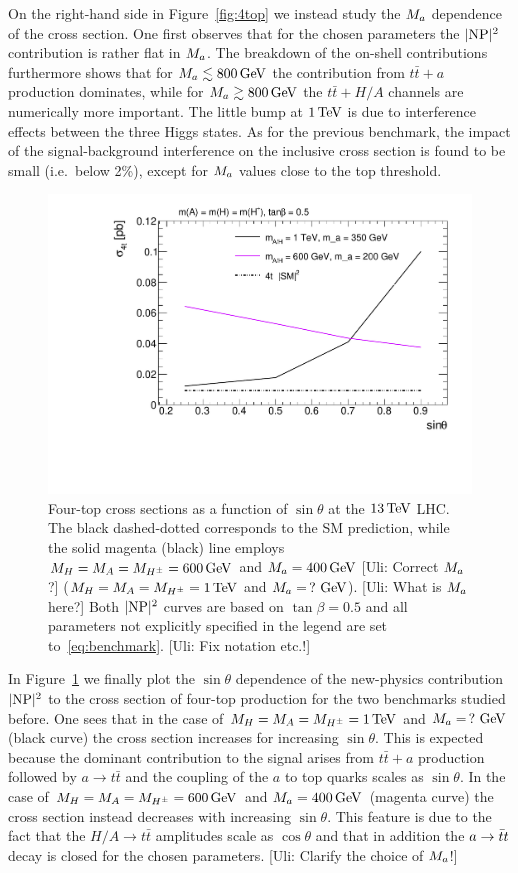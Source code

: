On the right-hand side in Figure~\ref{fig:4top} we instead  study the $M_{a}$ dependence of the cross section. One first observes that for the chosen parameters the $|{\rm NP}|^2$ contribution is rather flat in $M_{a}$. The breakdown of the on-shell contributions furthermore shows that for $M_{a} \lesssim 800 \, {\rm GeV}$ the contribution from $t \bar t + a$ production dominates, while for $M_{a} \gtrsim 800 \, {\rm GeV}$ the $t \bar t + H/A$ channels are numerically more important. The little bump at $1 \, {\rm TeV}$ is due to interference effects between the three Higgs states.  As for the previous benchmark,  the impact of the signal-background interference on the inclusive cross section is found to be small (i.e.~below 2\%), except for $M_{a}$ values close to the top threshold. 

\begin{figure}[t!]
\centering
\includegraphics[width=.475\textwidth]{texinputs/04_grid/figures/DMHF/4tops/WHP_final_stscan.pdf}
\vspace{1mm}
\caption{\label{DMHF-4top-scan3} Four-top cross sections as a function of $\sin \theta$ at the $13 \, {\rm TeV}$ LHC. The black dashed-dotted corresponds to the SM prediction, while the solid magenta (black) line employs $M_{H} =M_{A}=M_{H^{\pm}} = 600 \, {\rm GeV}$ and $M_{a} = 400 \, {\rm GeV}$ {\color{red} [Uli: Correct $M_{a}$?]}  ($M_{H} =M_{A}=M_{H^{\pm}} = 1 \, {\rm TeV}$ and $M_{a} = \, ? \,  \, {\rm GeV}$). {\color{red} [Uli: What is $M_{a}$ here?]} Both $|{\rm NP}|^2$ curves are based on $\tan \beta = 0.5$ and all parameters not explicitly specified in the legend are set to~\eqref{eq:benchmark}. {\color{red} [Uli: Fix notation etc.!]}}
\end{figure}

In Figure~\ref{DMHF-4top-scan3} we finally plot the  $\sin \theta$ dependence of the new-physics contribution~$|{\rm NP}|^2$ to the cross section of four-top production for the two benchmarks studied before. 
One sees that in the case of $M_{H} =M_{A}=M_{H^{\pm}} = 1 \, {\rm TeV}$ and $M_{a} = \, ? \, \, {\rm GeV}$ (black curve) the cross section  increases for increasing $\sin \theta$. This is expected because the dominant contribution to the signal arises from $t \bar t + a$ production followed by $a \to t \bar t$ and the coupling of the $a$ to top quarks scales as $\sin \theta$. In the case of $M_{H} =M_{A}=M_{H^{\pm}} = 600 \, {\rm GeV}$ and $M_{a} = 400 \, {\rm GeV}$~(magenta curve) the cross section instead decreases with increasing $\sin \theta$. This feature is due to the fact that the $H/A \to t \bar t$ amplitudes scale as $\cos \theta$ and that in addition the $a\rightarrow \bar{t}t$ decay is closed for the chosen parameters. {\color{red} [Uli: Clarify the choice of $M_{a}$!]}

